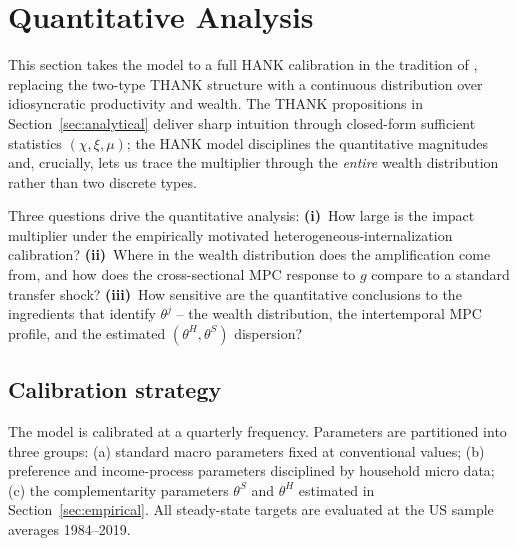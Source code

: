 \section{Quantitative Analysis}\label{sec:quant}

This section takes the model to a full HANK calibration in the tradition of
\citet{KaplanMollViolante2018}, replacing the two-type THANK structure with a
continuous distribution over idiosyncratic productivity and wealth. The THANK
propositions in Section~\ref{sec:analytical} deliver sharp intuition through
closed-form sufficient statistics $(\chi,\xi,\mu)$; the HANK model disciplines
the quantitative magnitudes and, crucially, lets us trace the multiplier
through the \emph{entire} wealth distribution rather than two discrete types.

Three questions drive the quantitative analysis:
\textbf{(i)}~How large is the impact multiplier under the empirically motivated
heterogeneous-internalization calibration?
\textbf{(ii)}~Where in the wealth distribution does the amplification come from,
and how does the cross-sectional MPC response to $g$ compare to a standard
transfer shock?
\textbf{(iii)}~How sensitive are the quantitative conclusions to the ingredients
that identify $\theta^{j}$ -- the wealth distribution, the intertemporal MPC
profile, and the estimated $(\theta^{H},\theta^{S})$ dispersion?

\subsection{Calibration strategy}\label{subsec:calibration}

The model is calibrated at a quarterly frequency. Parameters are partitioned
into three groups: (a) standard macro parameters fixed at conventional values;
(b) preference and income-process parameters disciplined by household micro
data; (c) the complementarity parameters $\theta^{S}$ and $\theta^{H}$
estimated in Section~\ref{sec:empirical}. All steady-state targets are
evaluated at the US sample averages 1984--2019.

